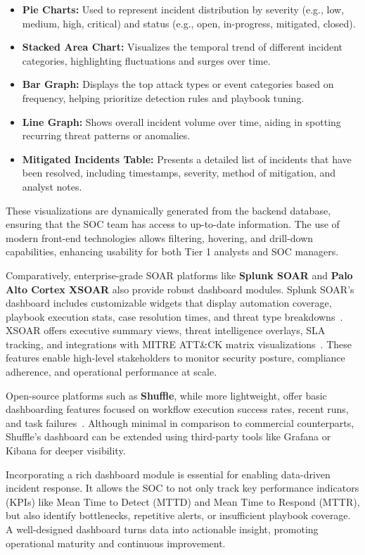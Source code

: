 \begin{itemize}
    \item \textbf{Pie Charts:} Used to represent incident distribution by severity (e.g., low, medium, high, critical) and status (e.g., open, in-progress, mitigated, closed).
    \item \textbf{Stacked Area Chart:} Visualizes the temporal trend of different incident categories, highlighting fluctuations and surges over time.
    \item \textbf{Bar Graph:} Displays the top attack types or event categories based on frequency, helping prioritize detection rules and playbook tuning.
    \item \textbf{Line Graph:} Shows overall incident volume over time, aiding in spotting recurring threat patterns or anomalies.
    \item \textbf{Mitigated Incidents Table:} Presents a detailed list of incidents that have been resolved, including timestamps, severity, method of mitigation, and analyst notes.
\end{itemize}

These visualizations are dynamically generated from the backend database, ensuring that the SOC team has access to up-to-date information. The use of modern front-end technologies allows filtering, hovering, and drill-down capabilities, enhancing usability for both Tier 1 analysts and SOC managers.

Comparatively, enterprise-grade SOAR platforms like \textbf{Splunk SOAR} and \textbf{Palo Alto Cortex XSOAR} also provide robust dashboard modules. Splunk SOAR’s dashboard includes customizable widgets that display automation coverage, playbook execution stats, case resolution times, and threat type breakdowns~\cite{splunk}. XSOAR offers executive summary views, threat intelligence overlays, SLA tracking, and integrations with MITRE ATT\&CK matrix visualizations~\cite{paloalto}. These features enable high-level stakeholders to monitor security posture, compliance adherence, and operational performance at scale.

Open-source platforms such as \textbf{Shuffle}, while more lightweight, offer basic dashboarding features focused on workflow execution success rates, recent runs, and task failures~\cite{techtarget}. Although minimal in comparison to commercial counterparts, Shuffle’s dashboard can be extended using third-party tools like Grafana or Kibana for deeper visibility.

Incorporating a rich dashboard module is essential for enabling data-driven incident response. It allows the SOC to not only track key performance indicators (KPIs) like Mean Time to Detect (MTTD) and Mean Time to Respond (MTTR), but also identify bottlenecks, repetitive alerts, or insufficient playbook coverage. A well-designed dashboard turns data into actionable insight, promoting operational maturity and continuous improvement.

